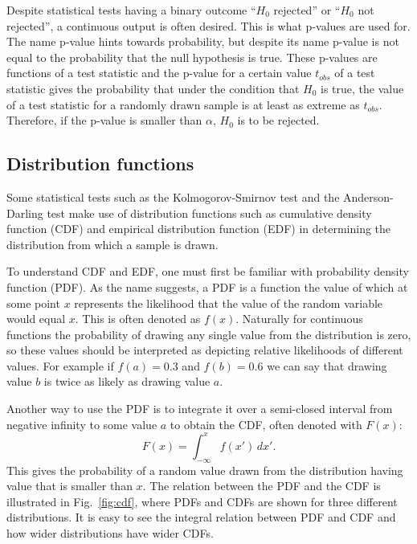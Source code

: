\documentclass[english, oneside]{HYgradu}
\begin{document}
Despite statistical tests having a binary outcome ``$H_0$ rejected'' or ``$H_0$ not rejected'', a continuous output is often desired. This is what p-values are used for. The name p-value hints towards probability, but despite its name p-value is not equal to the probability that the null hypothesis is true. These p-values are functions of a test statistic and the p-value for a certain value $t_{obs}$ of a test statistic gives the probability that under the condition that $H_0$ is true, the value of a test statistic for a randomly drawn sample is at least as extreme as $t_{obs}$. Therefore, if the p-value is smaller than $\alpha$, $H_0$ is to be rejected.

\subsection{Distribution functions} \label{sect:distribution-functions}
Some statistical tests such as the Kolmogorov-Smirnov test and the Anderson-Darling test make use of distribution functions such as cumulative density function (CDF) and empirical distribution function (EDF) in determining the distribution from which a sample is drawn. %

To understand CDF and EDF, one must first be familiar with probability density function (PDF).
As the name suggests, a PDF is a function the value of which at some point $x$ represents the likelihood that the value of the random variable would equal $x$. This is often denoted as $f(x)$. Naturally for continuous functions the probability of drawing any single value from the distribution is zero, so these values should be interpreted as depicting relative likelihoods of different values. For example if $f(a)=0.3$ and $f(b)=0.6$ we can say that drawing value $b$ is twice as likely as drawing value $a$. \citep{htk}

Another way to use the PDF is to integrate it over a semi-closed interval from negative infinity to some value $a$ to obtain the CDF, often denoted with $F(x)$:
\begin{equation}
	F(x) = \int_{-\infty}^x f(x') \,dx'.
\end{equation}	
This gives the probability of a random value drawn from the distribution having value that is smaller than $x$. The relation between the PDF and the CDF is illustrated in Fig.\ \ref{fig:cdf}, where PDFs and CDFs are shown for three different distributions. It is easy to see the integral relation between PDF and CDF and how wider distributions have wider CDFs. \citep{htk}
\end{document}
